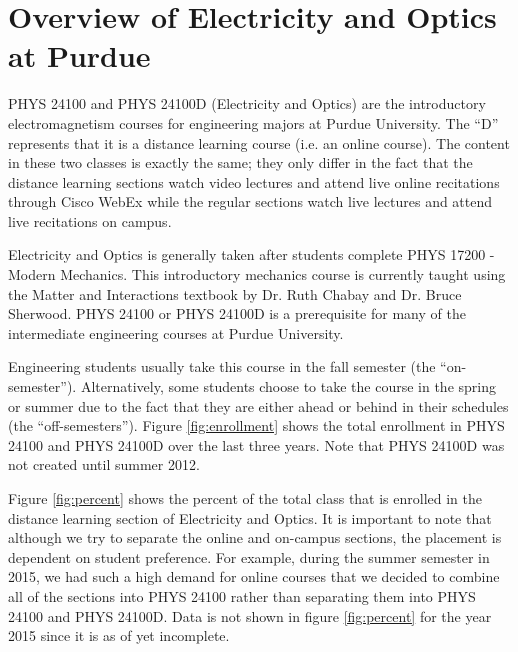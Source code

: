 \section{Overview of Electricity and Optics at Purdue}

PHYS 24100 and PHYS 24100D (Electricity and Optics) are the introductory electromagnetism courses for engineering majors at Purdue University. The ``D'' represents that it is a distance learning course (i.e. an online course). The content in these two classes is exactly the same; they only differ in the fact that the distance learning sections watch video lectures and attend live online recitations through Cisco WebEx while the regular sections watch live lectures and attend live recitations on campus.

Electricity and Optics is generally taken after students complete PHYS 17200 - Modern Mechanics. This introductory mechanics course is currently taught using the Matter and Interactions textbook by Dr. Ruth Chabay and Dr. Bruce Sherwood\cite{chabay2010}. PHYS 24100 or PHYS 24100D is a prerequisite for many of the intermediate engineering courses at Purdue University.

Engineering students usually take this course in the fall semester (the ``on-semester''). Alternatively, some students choose to take the course in the spring or summer due to the fact that they are either ahead or behind in their schedules (the ``off-semesters''). Figure \ref{fig:enrollment} shows the total enrollment in PHYS 24100 and PHYS 24100D over the last three years. Note that PHYS 24100D was not created until summer 2012.

Figure \ref{fig:percent} shows the percent of the total class that is enrolled in the distance learning section of Electricity and Optics. It is important to note that although we try to separate the online and on-campus sections, the placement is dependent on student preference. For example, during the summer semester in 2015, we had such a high demand for online courses that we decided to combine all of the sections into PHYS 24100 rather than separating them into PHYS 24100 and PHYS 24100D. Data is not shown in figure \ref{fig:percent} for the year 2015 since it is as of yet incomplete.

